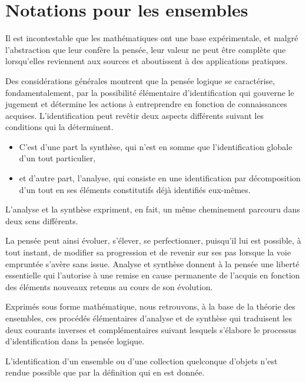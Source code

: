 \ifdefined\COMPLETE
\else
    
    
\fi

\chapter*{Notations pour les ensembles }

Il est incontestable que les mathématiques ont une base expérimentale,
et malgré l'abstraction que leur confère la pensée, leur valeur ne
peut être complète que lorsqu'elles reviennent aux sources et aboutissent
à des applications pratiques.

Des considérations générales montrent que la pensée logique se caractérise,
fondamentalement, par la possibilité élémentaire d'identification
qui gouverne le jugement et détermine les actions à entreprendre en
fonction de connaissances acquises. L'identification peut revêtir
deux aspects différents suivant les conditions qui la déterminent.

\begin{itemize}
\item C'est d'une part la synthèse, qui n'est en somme que l'identification
globale d'un tout particulier, 
\item et d'autre part, l'analyse, qui consiste en une identification par
décomposition d'un tout en ses éléments constitutifs déjà identifiés
eux-mêmes.
\end{itemize}

L'analyse et la synthèse expriment, en fait, un même cheminement parcouru
dans deux sens différents.

La pensée peut ainsi évoluer, s'élever, se perfectionner, puisqu'il
lui est possible, à tout instant, de modifier sa progression et de
revenir sur ses pas lorsque la voie empruntée s'avère sans issue.
Analyse et synthèse donnent à la pensée une liberté essentielle qui
l'autorise à une remise en cause permanente de l'acquis en fonction
des éléments nouveaux retenus au cours de son évolution.

Exprimés sous forme mathématique, nous retrouvons, à la base de la
théorie des ensembles, ces procédés élémentaires d'analyse et de synthèse
qui traduisent les deux courants inverses et complémentaires suivant
lesquels s'élabore le processus d'identification dans la pensée logique.

L'identification d'un ensemble ou d'une collection quelconque d'objets
n'est rendue possible que par la définition qui en est donnée.

